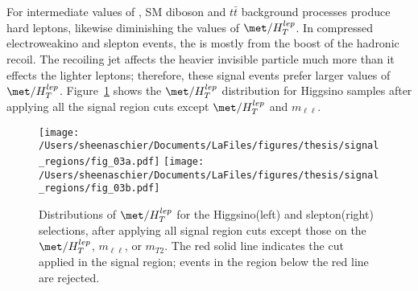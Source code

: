  For intermediate values of \met, SM diboson and $t\bar{t}$ background processes produce hard leptons, likewise diminishing the values of $\met/H_T^{lep}$.  In compressed electroweakino and slepton events, the \met{} is mostly from the boost of the hadronic recoil.  The recoiling jet affects the heavier invisible particle much more than it effects the lighter leptons; therefore, these signal events prefer larger values of $\met/H_T^{lep}$.  Figure~\ref{fig:METoverHTmll} shows the $\met/H_{T}^{lep}$ distribution for Higgsino samples after applying all the signal region cuts except $\met/H_{T}^{lep}$ and $m_{\ell\ell}$.
 \begin{figure}[tbp]
  \centering
  \texttt{[image: /Users/sheenaschier/Documents/LaFiles/figures/thesis/signal\_regions/fig\_03a.pdf]}
    \texttt{[image: /Users/sheenaschier/Documents/LaFiles/figures/thesis/signal\_regions/fig\_03b.pdf]}
 \caption{Distributions of $\met/H_{T}^{lep}$ for the Higgsino(left) and slepton(right) selections, after applying all signal region cuts except those on the $\met/H_{T}^{lep}$, $m_{\ell\ell}$, or $m_{T2}$.  The red solid line indicates the cut applied in the signal region; events in the region below the red line are rejected.}
 \label{fig:METoverHTmll}
 \end{figure}

